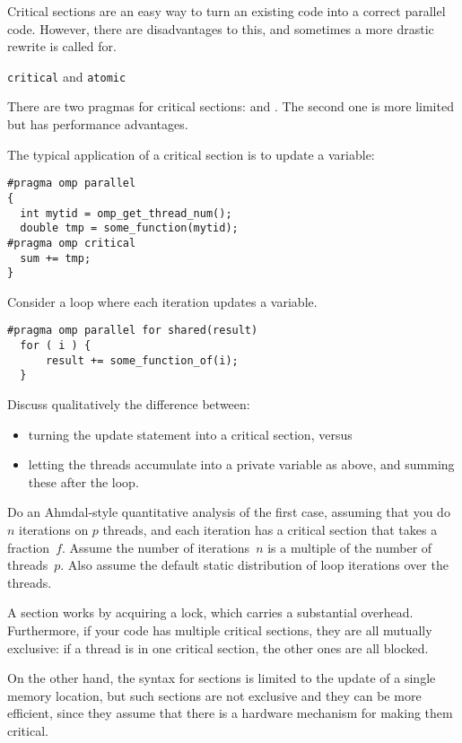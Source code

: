 Critical sections are an easy way to turn an existing code into a correct parallel code.
However, there are disadvantages to this, and sometimes a more drastic rewrite
is called for.

 {\texttt{critical} and \texttt{atomic}}

There are two pragmas for critical sections:  and .
The second one is more limited but has performance advantages.

The typical application of a critical section is to update a variable:
\begin{verbatim}
#pragma omp parallel
{
  int mytid = omp_get_thread_num();
  double tmp = some_function(mytid);
#pragma omp critical
  sum += tmp;
}
\end{verbatim}

\begin{exercise}
  Consider  a loop where each iteration updates a variable.
\begin{verbatim}
#pragma omp parallel for shared(result)
  for ( i ) {
      result += some_function_of(i);
  }
\end{verbatim}
  Discuss qualitatively
  the difference between:
  \begin{itemize}
  \item  turning the update statement into a critical section, versus
  \item letting the threads accumulate into a private variable  as above,
    and summing these after the loop.
  \end{itemize}  
  Do an Ahmdal-style quantitative analysis of the first case, assuming
  that you do $n$ iterations on $p$ threads, and each iteration has a
  critical section that takes a fraction~$f$.  Assume the number of
  iterations~$n$ is a multiple of the number of threads~$p$. Also
  assume the default static distribution of loop iterations over the
  threads.
\end{exercise}

A  section works by acquiring a lock, which carries a substantial overhead.
Furthermore, if your code has multiple critical sections, they are all mutually exclusive:
if a thread is in one critical section, the other ones are all blocked.

On the other hand, the syntax for  sections is limited to the update
of a single memory location, but such sections
are not exclusive and they can be more efficient, since they assume that there is a hardware
mechanism for making them critical.

